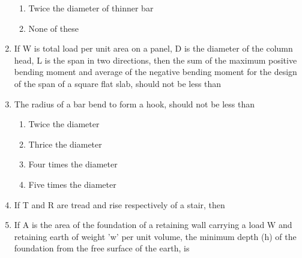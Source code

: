 \documentclass[11pt,a4paper]{article}
\begin{document}
\begin{enumerate}
\begin{enumerate}[label=\Alph*.]
\item{Twice the diameter of thinner bar}
\item{None of these}
\end{enumerate}
\item{If W is total load per unit area on a panel, D is the diameter of the column head, L is the span in two directions, then the sum of the maximum positive bending moment and average of the negative bending moment for the design of the span of a square flat slab, should not be less than}
\\
\item{The radius of a bar bend to form a hook, should not be less than}
\begin{enumerate}[label=\Alph*.]
\item{Twice the diameter}
\item{Thrice the diameter}
\item{Four times the diameter}
\item{Five times the diameter}
\end{enumerate}
\item{If T and R are tread and rise respectively of a stair, then}
\\
\item{If A is the area of the foundation of a retaining wall carrying a load W and retaining earth of weight 'w' per unit volume, the minimum depth (h) of the foundation from the free surface of the earth, is}
\\\begin{enumerate*}[itemjoin=\qquad, label=\Alph*.]

\end{enumerate*}
\end{enumerate}
\end{document}
